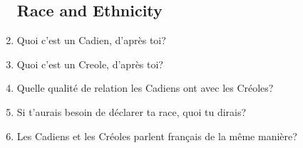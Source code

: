 \begin{enumerate}
\subsection{Race and Ethnicity}
    \item Quoi c'est un Cadien, d'après toi? \\
    \item Quoi c'est un Creole, d'après toi? \\
    \item Quelle qualité de relation les Cadiens ont avec les Créoles? \\
    \item Si t'aurais besoin de déclarer ta race, quoi tu dirais? \\
    \item Les Cadiens et les Créoles parlent français de la même manière? \\

\end{enumerate}
